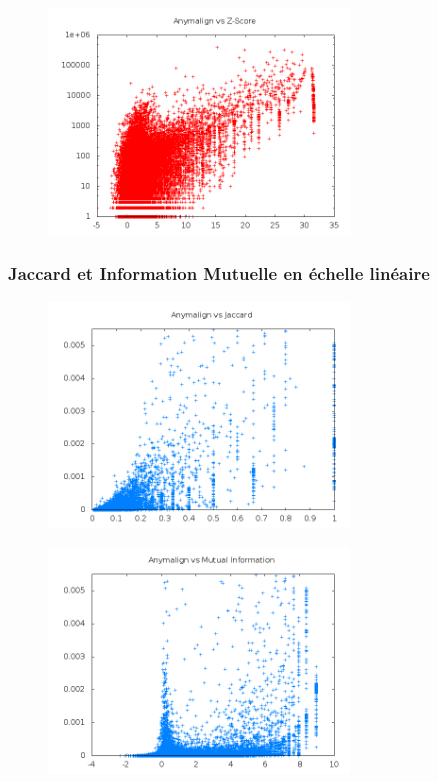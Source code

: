 \documentclass[a4paper,10pt]{article}
\begin{document}
\begin{figure}[!h]
\centering
\includegraphics[width=8cm]{zscorelog.png}
\end{figure}


\newpage
\subsubsection{Jaccard et Information Mutuelle en échelle linéaire}
\label{jaccimlineaires}


\begin{figure}[!h]
\centering
\includegraphics[width=8cm]{jacc.png}
\end{figure}

\begin{figure}[!h]
\centering
\includegraphics[width=8cm]{im.png}
\end{figure}
\end{document}

